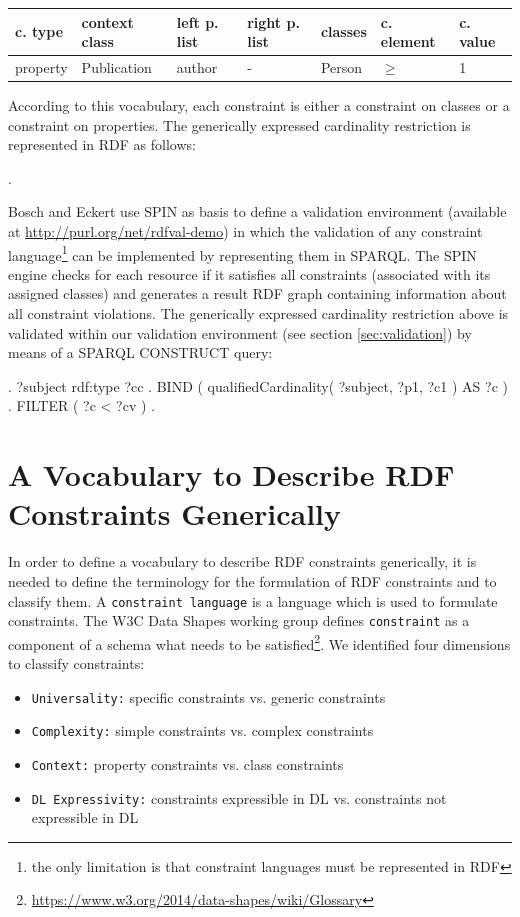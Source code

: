 \documentclass{llncs}
\newcommand{\ms}[1]{\texttt{#1}}
\newenvironment{gcotable}{
  \scriptsize
  \sffamily
  \vspace{0cm}
	\begin{center}
  \begin{tabular}{l|l|l|l|l|l|l}
  \hline
  \textbf{c. type} & \textbf{context class} & \textbf{left p. list} & \textbf{right p. list} & \textbf{classes} & \textbf{c. element} & \textbf{c. value} \\
  \hline

}{
  \hline
  \end{tabular}
	\end{center}
}
\begin{document}
\begin{gcotable}
property & Publication & author & - & Person & $\geq$ & 1 \\
\end{gcotable}

According to this vocabulary, each constraint is either a constraint on classes or a constraint on properties.
The generically expressed cardinality restriction is represented in RDF as follows:

\begin{ex}
[   a PropertyConstraint ;
    contextClass Publication ;
    leftProperties ( author ) ;
    classes ( Person ) ;
    constrainingElement ">=" ;
    constrainingValue 1 ] .
\end{ex}

Bosch and Eckert\cite{BoschEckert2014-2} use SPIN as basis to define a
validation environment (available at \url{http://purl.org/net/rdfval-demo}) in which the validation of any constraint language\footnote{the only limitation is that constraint languages must be represented in RDF} can be implemented by representing them in SPARQL. 
The SPIN engine checks for each resource if it satisfies all constraints (associated with its assigned classes) and generates a result RDF graph containing information about all constraint violations.
The generically expressed cardinality restriction above is validated within our validation environment (see section \ref{sec:validation}) by means of a SPARQL CONSTRUCT query:
\begin{ex}
[   a PropertyConstraint ;
    contextClass ?cc ;
    leftProperties ( ?p1 ) ;
    classes ( ?c1 ) ;
    constrainingElement ">=" ;
    constrainingValue ?cv ] .
?subject rdf:type ?cc .
BIND ( qualifiedCardinality( ?subject, ?p1, ?c1 ) AS ?c ) .
FILTER ( ?c < ?cv ) .		  
\end{ex}

\section{A Vocabulary to Describe RDF Constraints Generically} 
\label{sec:ontology}

In order to define a vocabulary to describe RDF constraints generically, it is needed to define the terminology for the formulation of RDF constraints and to classify them. 
A \ms{constraint language} is a language which is used to formulate constraints.
The W3C Data Shapes working group defines \ms{constraint} as a component of a schema what needs to be satisfied\footnote{\url{https://www.w3.org/2014/data-shapes/wiki/Glossary}}.
We identified four dimensions to classify constraints:
\begin{itemize}
  \item \ms{Universality:} specific constraints vs. generic constraints
	\item \ms{Complexity:} simple constraints vs. complex constraints
	\item \ms{Context:} property constraints vs. class constraints
	\item \ms{DL Expressivity:} constraints expressible in DL vs. constraints not expressible in DL
\end{itemize}
\end{document}

